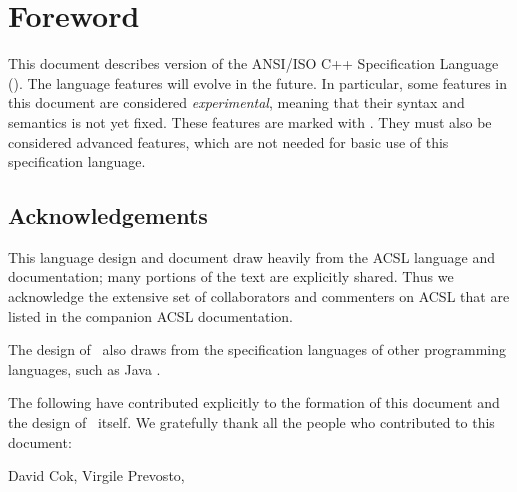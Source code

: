 \chapter*{Foreword}


This document describes version \version{} of the ANSI/ISO C++ Specification Language (\NAME). 
The language features will evolve in the future. 
In particular, some features in this document
are considered \emph{experimental}, meaning that their syntax and
semantics is not yet fixed.  
These features are marked with
\experimental.  
They must also be considered advanced features,
which are not needed for basic use of this
specification language.

\section*{Acknowledgements}

This language design and document draw heavily from the 
ACSL language and documentation; many portions of the text
are explicitly shared. Thus we acknowledge the extensive
set of collaborators and commenters on ACSL that are listed
in the companion ACSL documentation.

The design of \NAME~also draws from the specification
languages of other programming languages, such as Java \cite{leavens00jml}.

The following have contributed explicitly to the formation of
this document and the design of \NAME~itself.
We gratefully thank all the people who contributed to this document:

David Cok,
Virgile Prevosto,
